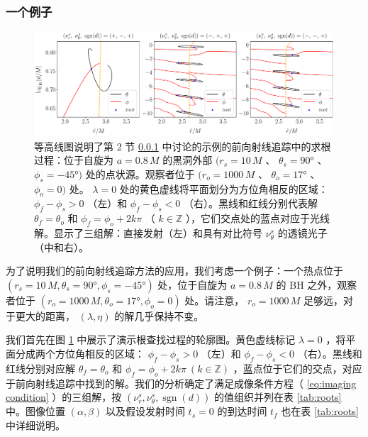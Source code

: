\documentclass[aps,reprint,superscriptaddress,nofootinbib,floatfix,longbibliography,preprintnumbers]{revtex4-1}
\begin{document}
   \subsubsection{一个例子  }    
   \label{subsubsec:example}    
   \begin{figure}[ht!]
    \centering
    \includegraphics[width=1\textwidth]{figures/contours_combined.pdf}
    \caption{等高线图说明了第 2 节    \ref{subsubsec:example}    中讨论的示例的前向射线追踪中的求根过程：位于自旋为    $a=0.8\,M$    的黑洞外部    $(r_s=10\,M$   、   $\theta_s=\ang{90}$   、   $\phi_s=-\ang{45})$    处的点状源。观察者位于
   $(r_o=1000\,M$   、   $\theta_o=\ang{17}$   、   $\phi_o=0)$    处。   $\lambda = 0$    处的黄色虚线将平面划分为方位角相反的区域：   $\phi_f - \phi_s > 0$   （左）和    $\phi_f - \phi_s < 0$   （右）。黑线和红线分别代表解    $\theta_f = \theta_o$    和    $\phi_f = \phi_o + 2k\pi$   （   $k\in\mathbb{Z}$   ），它们交点处的蓝点对应于光线解。显示了三组解：直接发射（左）和具有对比符号    $\nu_{\theta}^s$    的透镜光子（中和右）。  }
    \label{fig:contour plots}
\end{figure}     

为了说明我们的前向射线追踪方法的应用，我们考虑一个例子：一个热点位于    $(r_s=10\,M, \theta_s=\ang{90}, \phi_s=-\ang{45})$    处，位于自旋为    $a=0.8\,M$    的 BH 之外，观察者位于    $(r_o=1000\,M, \theta_o=\ang{17}, \phi_o=0)$    处。请注意，   $r_o = 1000\,M$    足够远，对于更大的距离，   $(\lambda, \eta)$    的解几乎保持不变。  

我们首先在图    \ref{fig:contour plots}    中展示了演示根查找过程的轮廓图。黄色虚线标记    $\lambda = 0$   ，将平面分成两个方位角相反的区域：   $\phi_f - \phi_s > 0$   （左）和    $\phi_f - \phi_s < 0$   （右）。黑线和红线分别对应解    $\theta_f = \theta_o$    和    $\phi_f = \phi_o + 2k\pi \  (k\in\mathbb{Z})$   ，蓝点位于它们的交点，对应于前向射线追踪中找到的解。我们的分析确定了满足成像条件方程（   \ref{eq:imaging condition}   ）的三组解，按    $(\nu_r^s, \nu_{\theta}^s, \operatorname{sgn}(d))$    的值组织并列在表    \ref{tab:roots}    中。图像位置    $(\alpha, \beta)$    以及假设发射时间    $t_s = 0$    的到达时间    $t_f$    也在表    \ref{tab:roots}    中详细说明。  
\end{document}
